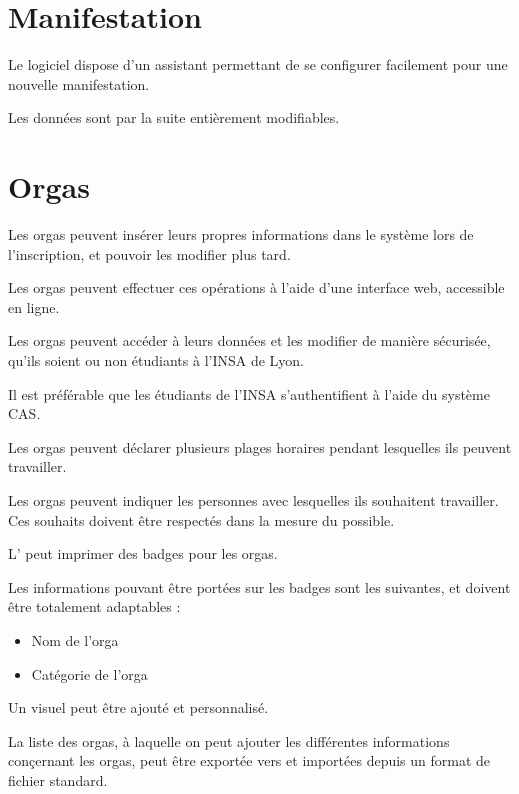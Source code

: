 \section{Manifestation}



Le logiciel dispose d'un assistant permettant de se configurer facilement pour une nouvelle manifestation.

Les données sont par la suite entièrement modifiables.



\section{Orgas}



Les orgas peuvent insérer leurs propres informations dans le système lors de l'inscription, et pouvoir les modifier plus tard.

Les orgas peuvent effectuer ces opérations à l'aide d'une interface web, accessible en ligne.

Les orgas peuvent accéder à leurs données et les modifier de manière sécurisée, qu'ils soient ou non étudiants à l'INSA de Lyon.

Il est préférable que les étudiants de l'INSA s'authentifient à l'aide du système CAS.

Les orgas peuvent déclarer plusieurs plages horaires pendant lesquelles ils peuvent travailler.

Les orgas peuvent indiquer les personnes avec lesquelles ils souhaitent travailler. Ces souhaits doivent être respectés dans la mesure du possible.

L'\oh{} peut imprimer des badges pour les orgas.

Les informations pouvant être portées sur les badges sont les suivantes, et doivent être totalement adaptables : 
\begin{itemize}
\item Nom de l'orga
\item Catégorie de l'orga
\end{itemize}

Un visuel peut être ajouté et personnalisé.


La liste des orgas, à laquelle on peut ajouter les différentes informations conçernant les orgas, peut être exportée vers et importées depuis un format de fichier standard.


